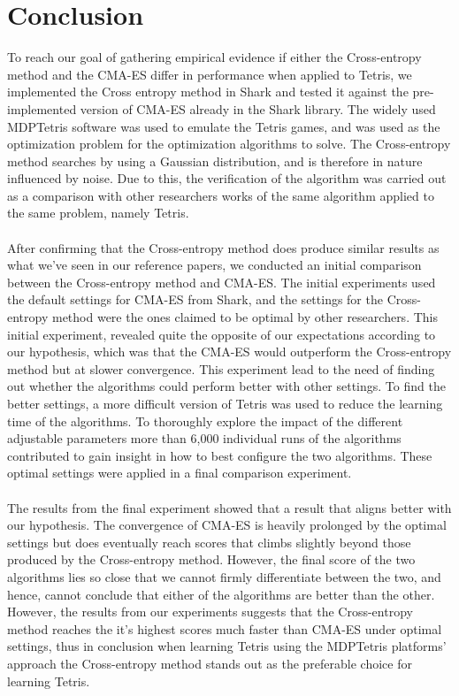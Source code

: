 \section{Conclusion}

To reach our goal of gathering empirical evidence if either the Cross-entropy method
and the CMA-ES differ in performance when applied to Tetris, we implemented the Cross
entropy method in Shark and tested it against the pre-implemented version of CMA-ES
already in the Shark library. The widely used MDPTetris software was used to emulate the
Tetris games, and was used as the optimization problem for the optimization algorithms to solve.
The Cross-entropy method searches by using a Gaussian 
distribution, and is therefore in nature influenced by noise. Due to this, 
the verification of the algorithm was carried out as a comparison with other 
researchers works of the same algorithm applied to the same problem, namely Tetris.\\
\\
After confirming that the Cross-entropy method does produce similar results as 
what we've seen in our reference papers, we conducted an initial comparison between the
Cross-entropy method and CMA-ES. The initial experiments used the default settings for CMA-ES
from Shark,
and the settings for the Cross-entropy method were the ones claimed to be optimal by other 
researchers. This initial experiment, revealed quite the opposite of our expectations 
according to our hypothesis, which was that the CMA-ES would outperform the Cross-entropy method
but at slower convergence. This experiment lead to the need of finding out whether the algorithms
could perform better with other settings. To find the better settings, a more difficult version
of Tetris was used to reduce the learning time of the algorithms. To thoroughly explore 
the impact of the different adjustable parameters more than 6,000 individual runs of the 
algorithms contributed to gain insight in how to best configure the two algorithms. These 
optimal settings were applied in a final comparison experiment.\\
\\
The results from the final experiment showed that a result that aligns better with our
hypothesis. The convergence of CMA-ES is heavily prolonged by the optimal settings
but does eventually reach scores that climbs slightly beyond those produced by the
Cross-entropy method. However, the final score of the two algorithms lies so close that
we cannot firmly differentiate between the two, and hence, cannot conclude that either of the
algorithms are better than the other. However, the results from our experiments 
suggests that the Cross-entropy method reaches the 
it's highest scores much faster than CMA-ES under optimal settings, thus in conclusion
when learning Tetris using the MDPTetris platforms' approach the Cross-entropy method 
stands out as the preferable choice for learning Tetris.

